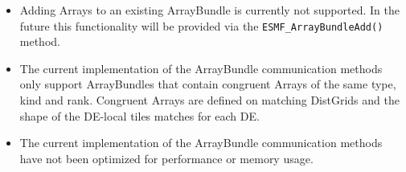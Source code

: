 
\begin{itemize}
\item Adding Arrays to an existing ArrayBundle is currently not supported. In
the future this functionality will be provided via the
{\tt ESMF\_ArrayBundleAdd()} method.
\item The current implementation of the ArrayBundle communication methods only
support ArrayBundles that contain congruent Arrays of the same type, kind and
rank. Congruent Arrays are defined on matching DistGrids and the shape of the
DE-local tiles matches for each DE.
\item The current implementation of the ArrayBundle communication methods have
not been optimized for performance or memory usage.
\end{itemize}
